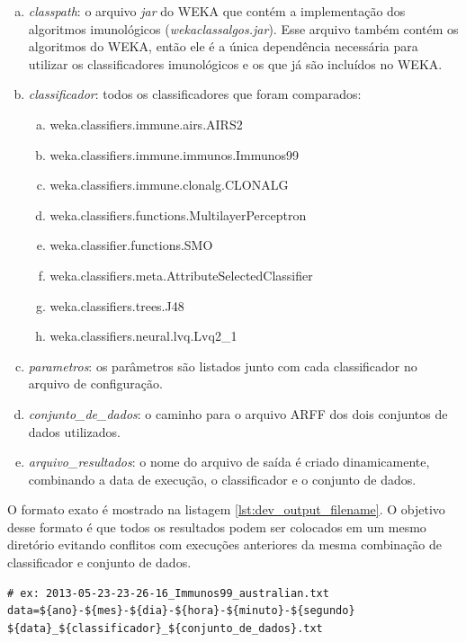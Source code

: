 \begin{enumerate}[a)]
    \item \emph{classpath}: o arquivo \emph{jar} do WEKA que contém a implementação dos algoritmos imunológicos (\emph{wekaclassalgos.jar}). Esse arquivo também contém os algoritmos do WEKA, então ele é a única dependência necessária para utilizar os classificadores imunológicos e os que já são incluídos no WEKA.
    \item \emph{classificador}: todos os classificadores que foram comparados:
        \begin{enumerate}[a)]
            \item weka.classifiers.immune.airs.AIRS2
            \item weka.classifiers.immune.immunos.Immunos99
            \item weka.classifiers.immune.clonalg.CLONALG
            \item weka.classifiers.functions.MultilayerPerceptron
            \item weka.classifier.functions.SMO
            \item weka.classifiers.meta.AttributeSelectedClassifier
            \item weka.classifiers.trees.J48
            \item weka.classifiers.neural.lvq.Lvq2\_1
        \end{enumerate}
    \item \emph{parametros}: os parâmetros são listados junto com cada classificador no arquivo de configuração.
    \item \emph{conjunto\_de\_dados}: o caminho para o arquivo ARFF dos dois conjuntos de dados utilizados.
    \item \emph{arquivo\_resultados}: o nome do arquivo de saída é criado dinamicamente, combinando a data de execução, o classificador e o conjunto de dados.
\end{enumerate}

O formato exato é mostrado na listagem \ref{lst:dev_output_filename}. O objetivo desse formato é que todos os resultados podem ser colocados em um mesmo diretório evitando conflitos com execuções anteriores da mesma combinação de classificador e conjunto de dados.

\vspace{0.5cm}
\begin{lstlisting}[caption=Formato do nome do arquivo de resultados, label=lst:dev_output_filename]
# ex: 2013-05-23-23-26-16_Immunos99_australian.txt
data=${ano}-${mes}-${dia}-${hora}-${minuto}-${segundo}
${data}_${classificador}_${conjunto_de_dados}.txt
\end{lstlisting}
\vspace{0.5cm}

